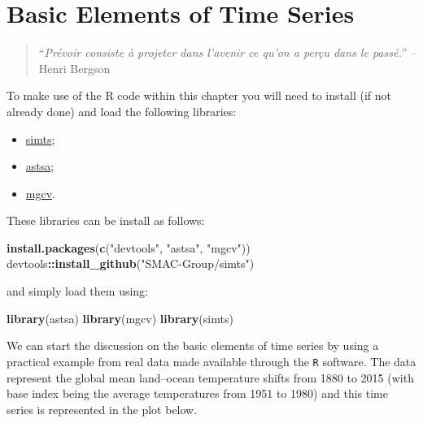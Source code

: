 \documentclass[]{book}
\newenvironment{Shaded}{\begin{snugshade}}{\end{snugshade}}
\newcommand{\KeywordTok}[1]{\textcolor[rgb]{0.13,0.29,0.53}{\textbf{#1}}}
\newcommand{\NormalTok}[1]{#1}
\newcommand{\OperatorTok}[1]{\textcolor[rgb]{0.81,0.36,0.00}{\textbf{#1}}}
\newcommand{\StringTok}[1]{\textcolor[rgb]{0.31,0.60,0.02}{#1}}
\providecommand{\tightlist}{%
  \setlength{\itemsep}{0pt}\setlength{\parskip}{0pt}}
\theoremstyle{definition}
\theoremstyle{definition}
\theoremstyle{definition}
\theoremstyle{remark}
\let\BeginKnitrBlock\begin \let\EndKnitrBlock\end
\begin{document}
\hypertarget{basic-elements-of-time-series}{%
\chapter{Basic Elements of Time
Series}\label{basic-elements-of-time-series}}

\begin{quote}
``\emph{Prévoir consiste à projeter dans l'avenir ce qu'on a perçu dans
le passé.}'' -- Henri Bergson
\end{quote}

\BeginKnitrBlock{rmdimportant}
To make use of the R code within this chapter you will need to install
(if not already done) and load the following libraries:

\begin{itemize}
\tightlist
\item
  \href{http://simts.smac-group.com/}{simts};
\item
  \href{https://cran.r-project.org/web/packages/astsa/index.html}{astsa};
\item
  \href{https://cran.r-project.org/web/packages/mgcv/index.html}{mgcv}.
\end{itemize}

These libraries can be install as follows:
\EndKnitrBlock{rmdimportant}

\begin{Shaded}
\begin{Highlighting}[]
\KeywordTok{install.packages}\NormalTok{(}\KeywordTok{c}\NormalTok{(}\StringTok{"devtools"}\NormalTok{, }\StringTok{"astsa"}\NormalTok{, }\StringTok{"mgcv"}\NormalTok{))}
\NormalTok{devtools}\OperatorTok{::}\KeywordTok{install_github}\NormalTok{(}\StringTok{"SMAC-Group/simts"}\NormalTok{)}
\end{Highlighting}
\end{Shaded}

and simply load them using:

\begin{Shaded}
\begin{Highlighting}[]
\KeywordTok{library}\NormalTok{(astsa)}
\KeywordTok{library}\NormalTok{(mgcv)}
\KeywordTok{library}\NormalTok{(simts)}
\end{Highlighting}
\end{Shaded}

We can start the discussion on the basic elements of time series by
using a practical example from real data made available through the
\texttt{R} software. The data represent the global mean land--ocean
temperature shifts from 1880 to 2015 (with base index being the average
temperatures from 1951 to 1980) and this time series is represented in
the plot below.
\end{document}
